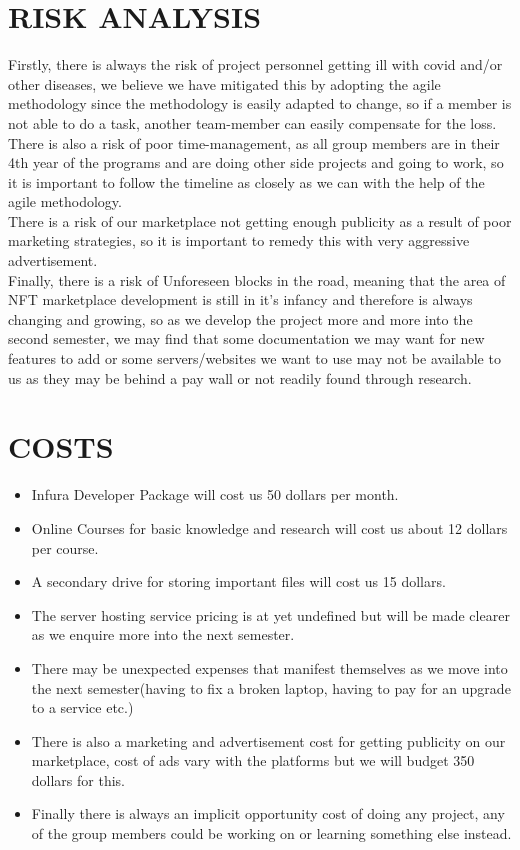 \documentclass[a4paper,12pt]{article}
\begin{document}
\vspace{1cm}


\section{RISK ANALYSIS}
Firstly, there is always the risk of project personnel getting ill with covid and/or other diseases, we believe we have mitigated this by adopting the agile methodology since the methodology is easily adapted to change, so if a member is not able to do a task, another team-member can easily compensate for the loss.\\
There is also a risk of poor time-management, as all group members are in their 4th year of the programs and are doing other side projects and going to work, so it is important to follow the timeline as closely as we can with the help of the agile methodology.\\
There is a risk of our marketplace not getting enough publicity as a result of poor marketing strategies, so it is important to remedy this with very aggressive advertisement.\\
Finally, there is a risk of Unforeseen blocks in the road, meaning that the area of NFT marketplace development is still in it's infancy and therefore is always changing and growing, so as we develop the project more and more into the second semester, we may find that some documentation we may want for new features to add or some servers/websites we want to use may not be available to us as they may be behind a pay wall or not readily found through research.

\section{COSTS}
\begin{itemize}
  \item Infura Developer Package will cost us 50 dollars per month.
  \item Online Courses for basic knowledge and research will cost us about 12 dollars per course.
  \item A secondary drive for storing important files will cost us 15 dollars.
  \item The server hosting service pricing is at yet undefined but will be made clearer as we enquire more into the next semester.
  \item There may be unexpected expenses that manifest themselves as we move into the next semester(having to fix a broken laptop, having to pay for an upgrade to a service etc.)
  \item There is also a marketing and advertisement cost for getting publicity on our marketplace, cost of ads vary with the platforms but we will budget 350 dollars for this.
  \item Finally there is always an implicit opportunity cost of doing any project, any of the group members could be working on or learning something else instead.
\end{itemize}
\end{document}
